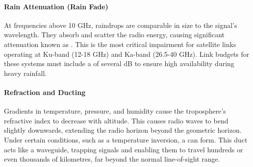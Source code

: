 \paragraph{Rain Attenuation (Rain Fade)}
At frequencies above 10 GHz, raindrops are comparable in size to the signal's wavelength. They absorb and scatter the radio energy, causing significant attenuation known as . This is the most critical impairment for satellite links operating at Ku-band (12-18 GHz) and Ka-band (26.5-40 GHz). Link budgets for these systems must include a  of several dB to ensure high availability during heavy rainfall.

\paragraph{Refraction and Ducting}
Gradients in temperature, pressure, and humidity cause the troposphere's refractive index to decrease with altitude. This causes radio waves to bend slightly downwards, extending the radio horizon beyond the geometric horizon. Under certain conditions, such as a temperature inversion, a  can form. This duct acts like a waveguide, trapping signals and enabling them to travel hundreds or even thousands of kilometres, far beyond the normal line-of-sight range.


